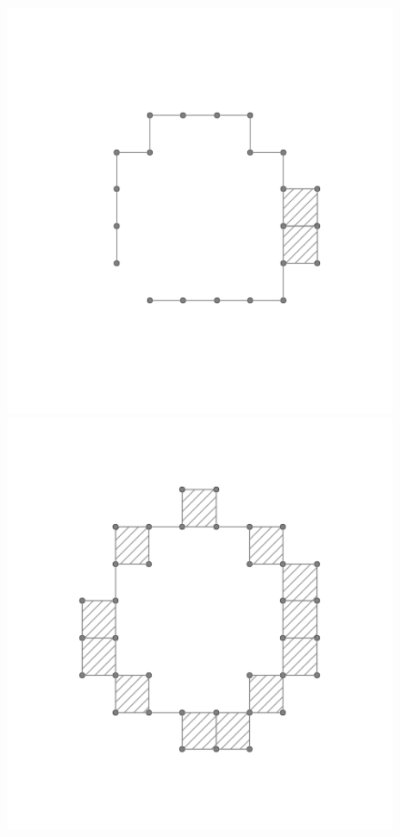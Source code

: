 \documentclass[12pt,a4paper,twoside]{article} %
\theoremstyle{plain}
\theoremstyle{definition}
\begin{document}
\begin{figure}[h!]
\includegraphics[scale=0.33]{img/f3.png}
\includegraphics[scale=0.33]{img/f4.png}

\end{figure}
\end{document}
